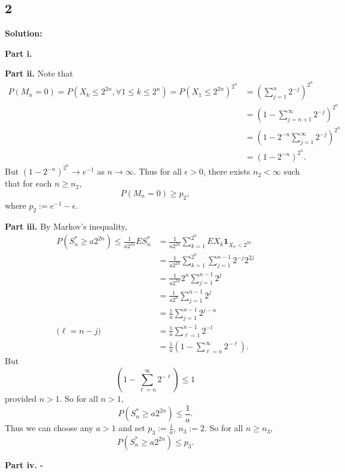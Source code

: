\documentclass[12pt]{article}
\newcounter{ProofCounter}
\newenvironment{Solution}{\stepcounter{ProofCounter}\textbf{Solution:}}{\hfill$\square$}
\begin{document}

\newpage
\subsection*{2}
\begin{Solution}

  \textbf{Part i.}

  \textbf{Part ii.} Note that
  \begin{align*}
    P(M_n = 0) = P(X_k \leq 2^{2n}, \forall 1 \leq k \leq 2^{n}) = P(X_1 \leq 2^{2n})^{2^n} & = \left( \sum_{j=1}^{n}2^{-j} \right)^{2^n} \\
    & = \left( 1 - \sum_{j=n+1}^{\infty}2^{-j} \right)^{2^n} \\
    & = \left( 1 - 2^{-n}\sum_{j=1}^{\infty} 2^{-j} \right)^{2^{n}} \\
    & = (1 - 2^{-n})^{2^n}.
  \end{align*}
  But $(1 - 2^{-n})^{2^n} \rightarrow e^{-1}$ as $n \rightarrow \infty$. Thus for all $\epsilon > 0$, there exists $n_2 < \infty$ such that for each $n \geq n_2$,
  \[
    P(M_n = 0) \geq p_2,
  \]
  where $p_2 := e^{-1} - \epsilon$.

  \textbf{Part iii.} By Markov's inequality,
  \begin{align*}
    P(S_n^* \geq a 2^{2n}) \leq \frac{1}{a2^{2n}} ES_n^* & = \frac{1}{a2^{2n}} \sum_{k=1}^{2^{n}} EX_k\bm{1}_{X_k < 2^{2n}} \\
    & = \frac{1}{a2^{2n}} \sum_{k=1}^{2^n}\sum_{j=1}^{n-1} 2^{-j} 2^{2j} \\
    & = \frac{1}{a2^{2n}} 2^{n}\sum_{j=1}^{n-1} 2^{j} \\
    & = \frac{1}{a2^{n}} \sum_{j=1}^{n-1}2^{j} \\
    & = \frac{1}{a} \sum_{j=1}^{n-1} 2^{j-n} \\
    \text{($\ell = n-j$)} \ \ \ & = \frac{1}{a} \sum_{\ell=1}^{n-1}2^{-l} \\
    & = \frac{1}{a} \left( 1 - \sum_{\ell=n}^{\infty} 2^{-\ell} \right).
  \end{align*}
  But 
  \[
    \left( 1 - \sum_{\ell=n}^{\infty} 2^{-\ell} \right)  \leq 1
  \]
  provided $n > 1$. So for all $n > 1$,
  \[
    P(S_n^* \geq a 2^{2n})  \leq \frac{1}{a}.
  \]
  Thus we can choose any $a > 1$ and set $p_3 := \frac{1}{a}$, $n_3 := 2$. So for all $n \geq n_3$,
  \[
    P(S_n^* \geq a 2^{2n})  \leq p_3.
  \]

  \textbf{Part iv.}
\end{Solution}
\end{document}
